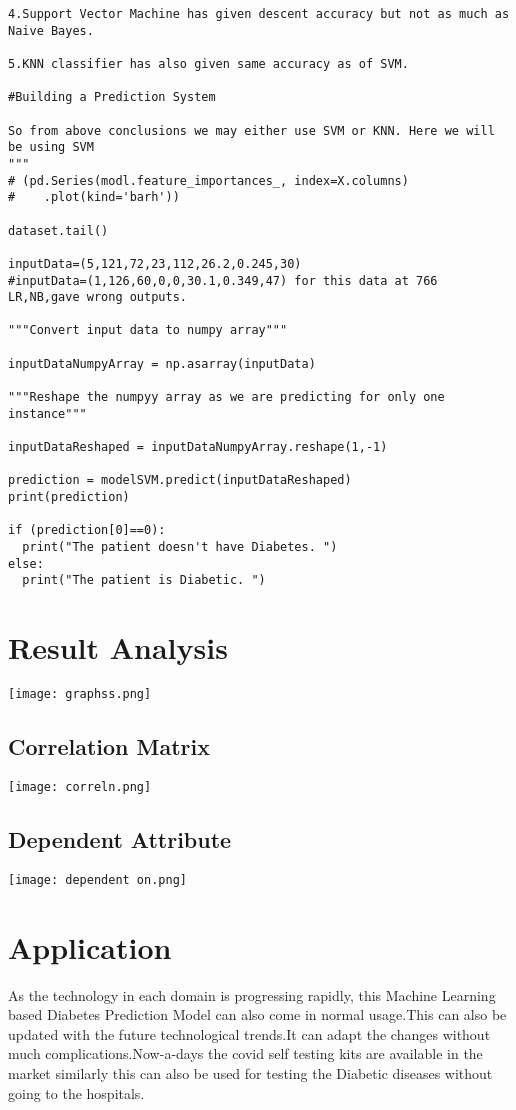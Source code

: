 \documentclass[pdftex,a4paper,11pt,oneside,openright]{report}
\begin{document}
\begin{lstlisting}
4.Support Vector Machine has given descent accuracy but not as much as Naive Bayes.

5.KNN classifier has also given same accuracy as of SVM.

#Building a Prediction System

So from above conclusions we may either use SVM or KNN. Here we will be using SVM
"""
# (pd.Series(modl.feature_importances_, index=X.columns)
#    .plot(kind='barh'))

dataset.tail()

inputData=(5,121,72,23,112,26.2,0.245,30)
#inputData=(1,126,60,0,0,30.1,0.349,47) for this data at 766 LR,NB,gave wrong outputs.

"""Convert input data to numpy array"""

inputDataNumpyArray = np.asarray(inputData)

"""Reshape the numpyy array as we are predicting for only one instance"""

inputDataReshaped = inputDataNumpyArray.reshape(1,-1)

prediction = modelSVM.predict(inputDataReshaped)
print(prediction)

if (prediction[0]==0):
  print("The patient doesn't have Diabetes. ")
else:
  print("The patient is Diabetic. ")

\end{lstlisting}


\chapter{Result Analysis}
\centering
\texttt{[image: graphss.png]}
 \section{Correlation Matrix}
    \centering
    \texttt{[image: correln.png]}
 \section{Dependent Attribute}
    \centering
    \texttt{[image: dependent on.png]}

\chapter{Application}
\Large{As the technology in each domain is progressing rapidly, this Machine Learning based Diabetes Prediction Model can also come in normal usage.This can also be updated with the future technological trends.It can adapt the changes without much complications.Now-a-days the covid self testing kits are available in the market similarly this can also be used for testing the Diabetic diseases without going to the hospitals. } 
\end{document}
